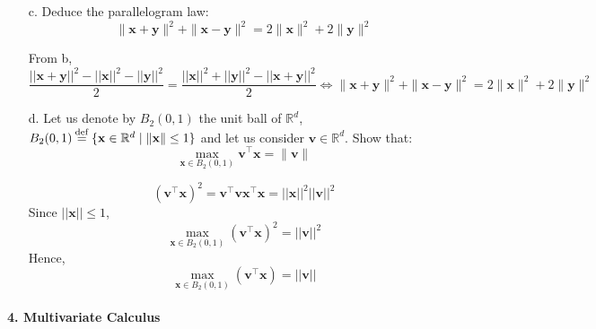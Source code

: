 \documentclass[11pt]{article}
\newcommand{\R}{\mathbb{R}}                     %
\newcommand{\bx}{\mathbf{x}}
\newcommand{\by}{\mathbf{y}}
\newcommand{\bv}{\mathbf{v}}
\newcommand{\eqdef}{\mathbin{\stackrel{\rm def}{=}}}
\begin{document}
\begin{itemize}
    \item[c.] Deduce the parallelogram law:
        \begin{displaymath}
                \|\bx+\by\|^2 + \|\bx-\by\|^2 = 2\|\bx\|^2 + 2\|\by\|^2
        \end{displaymath}
 
\color{blue}
From b, 
$$\frac{||\bx+\by||^2-||\bx||^2-||\by||^2}{2}=\frac{||\bx||^2+||\by||^2-||\bx+\by||^2}{2} \Leftrightarrow \|\bx+\by\|^2 + \|\bx-\by\|^2 = 2\|\bx\|^2 + 2\|\by\|^2$$
\color{black}

    \item[d.] Let us denote by $B_2(0, 1)$ the unit ball of $\R^d$, $B_2(0,1)\eqdef
        \{\bx\in\R^d\;|\;\|\bx\|\leq 1\}$ and let us consider $\bv\in\R^d$. Show that:
        \begin{displaymath}
            \max_{\bx\in B_2(0,1)}\bv^\intercal \bx = \|\bv\|
        \end{displaymath}

\color{blue}
$$(\bv^\intercal \bx)^2 = \bv^\intercal \bv \bx^\intercal \bx = ||\bx||^2||\bv||^2 $$
Since $||\bx|| \leq 1$, $$\max_{\bx\in B_2(0,1)} (\bv^\intercal \bx)^2 = ||\bv||^2$$
Hence, $$\max_{\bx\in B_2(0,1)} (\bv^\intercal \bx) = ||\bv||$$
\color{black}

\end{itemize}

\paragraph{4. Multivariate Calculus}
\end{document}
